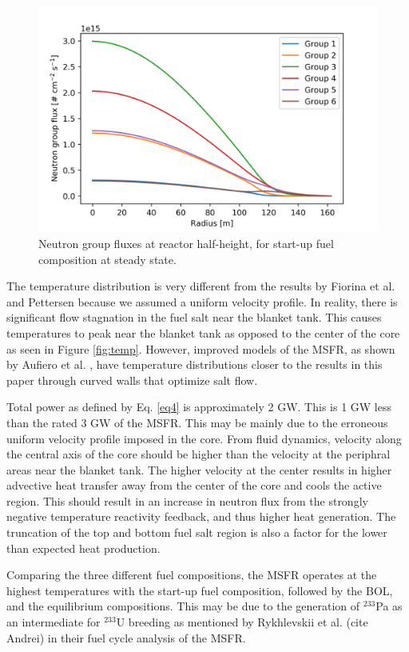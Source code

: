 \documentclass{anstrans}
\begin{document}
\begin{figure}[H] 
	\centering
	\includegraphics[width=.53\textwidth]{./figures/stflux}
	\captionsetup{justification=centering}
	\caption{Neutron group fluxes at reactor half-height, for start-up
	fuel composition at steady state.}
	\label{fig:stflux}
\end{figure} 

	The temperature distribution is very different from the results by Fiorina
	et al. \cite{fiorina_modelling_2014} and Pettersen
	\cite{pettersen_coupled_2016} because we assumed a uniform velocity
	profile. In reality, there is significant flow stagnation in the fuel salt
	near the blanket tank. This causes temperatures to peak near the blanket
	tank as opposed to the center of the core as seen in Figure \ref{fig:temp}.
	However, improved models of the \gls{MSFR}, as shown by Aufiero et al.
	\cite{aufiero_development_2014}, have temperature distributions closer to
	the results in this paper through curved walls that optimize salt flow.
	
	Total power as defined by Eq. \ref{eq4} is approximately 2 GW. This
	is 1 GW less than the rated 3 GW of the \gls{MSFR}. This may be mainly due
	to the erroneous uniform velocity profile imposed in the core. From
	fluid dynamics, velocity along the central axis of the core should be
	higher than the velocity at the periphral areas near the blanket tank.
	The higher velocity at the center results in higher advective heat transfer
	away from the center of the core and cools the active region. This should
	result in an increase in neutron flux from the strongly negative
	temperature reactivity feedback, and thus higher heat generation. The
	truncation of the top and bottom fuel salt region is also a factor for
	the lower than expected heat production.
	
	Comparing the three different fuel compositions, the \gls{MSFR} operates at
	the highest temperatures with the start-up fuel composition, followed by
	the \gls{BOL}, and the equilibrium compositions. This may be due to the
	generation of $^{233}$Pa as an intermediate for $^{233}$U breeding as
	mentioned by Rykhlevskii et al. (cite Andrei) in their fuel cycle analysis
	of the \gls{MSFR}.
\end{document}
